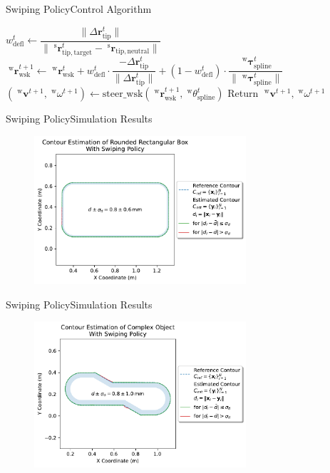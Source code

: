 \documentclass[AIRbeamer
,optEnglish
,optBiber
,optBibstyleAlphabetic
,optBeamerClassicFormat%
]{AIRlatex}
\begin{document}
\begin{frame}{Swiping Policy}{Control Algorithm}
\begin{algorithm}[H]
\begin{algorithmic}[1]
{                    \State \(w_{\mathrm{defl}}^{t} \gets \dfrac{\|\Delta\boldsymbol{r}_{\mathrm{tip}}^{t}\|}{\|\;^{\mathrm{s}}\boldsymbol{r}_{\mathrm{tip, target}}^{t} - \;^{\mathrm{s}}\boldsymbol{r}_{\mathrm{tip, neutral}}\|}\)
                    \State \(\;^{\mathrm{w}}\boldsymbol{r}_{\mathrm{wsk}}^{t+1} \gets \;^{\mathrm{w}}\boldsymbol{r}_{\mathrm{wsk}}^{t} + w_{\mathrm{defl}}^{t} \cdot \dfrac{-\Delta\boldsymbol{r}_{\mathrm{tip}}^{t}}{\|\Delta\boldsymbol{r}_{\mathrm{tip}}^{t}\|} + (1 - w_{\mathrm{defl}}^{t}) \cdot \dfrac{\;^{\mathrm{w}}\boldsymbol{\tau}_{\mathrm{spline}}^{t}}{\|\;^{\mathrm{w}}\boldsymbol{\tau}_{\mathrm{spline}}^{t}\|}\)
                    \State \((\;^{\mathrm{w}}\boldsymbol{v}^{t+1}, \;^{\mathrm{w}}\omega^{t+1}) \gets \mathrm{steer\_wsk}(\;^{\mathrm{w}}\boldsymbol{r}_{\mathrm{wsk}}^{t+1},\;^{\mathrm{w}}\theta_{\mathrm{spline}}^{t})\)
                    \State Return \(\;^{\mathrm{w}}\boldsymbol{v}^{t+1}, \;^{\mathrm{w}}\omega^{t+1}\)
                }
            \end{algorithmic}
        \end{algorithm}
    \end{frame}
    \begin{frame}{Swiping Policy}{Simulation Results}
        \begin{figure}[htb]
            \centering
            \includegraphics[width=0.7\textwidth]{figures/experiments/rounded-rectangular-box-swiping}
        \end{figure}
    \end{frame}
    \begin{frame}{Swiping Policy}{Simulation Results}
        \begin{figure}[htb]
            \centering
            \includegraphics[width=0.7\textwidth]{figures/experiments/complex-object-swiping}
        \end{figure}
    \end{frame}
\end{document}
